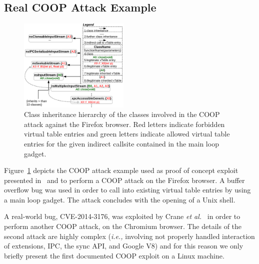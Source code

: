 \subsection{Real COOP Attack Example}
\label{Real COOP Attack Example}
\label{Running Example: CVE X}
\begin{figure}[h!]
    \centering
    \includegraphics[width=0.47\textwidth]{figures/class_hierarchy.pdf}
\caption{Class inheritance hierarchy of the classes involved in the COOP attack against the Firefox browser. Red letters 
indicate forbidden virtual table entries and green letters indicate allowed virtual table entries for the given indirect callsite
contained in the main loop gadget.}
\label{Class exploit}
\vspace{-.29cm}
\end{figure}
Figure~\ref{Class exploit} depicts the COOP attack example used as proof of concept exploit presented in~\cite{schuster:coop} and to perform a COOP attack on the Firefox browser. A buffer overflow bug was used in order to call into existing virtual table entries by using a main loop gadget. The attack concludes with the opening of a Unix shell. 

A real-world bug, CVE-2014-3176, was exploited by Crane \textit{et al.}~\cite{crane:readactor++} in order to perform another COOP attack, on the Chromium browser. The details of the second attack are highly complex (\textit{i.e.,} involving not properly handled interaction of extensions, IPC, the sync API, and Google V8) and for this reason we only briefly present the first documented COOP exploit on a Linux machine.

